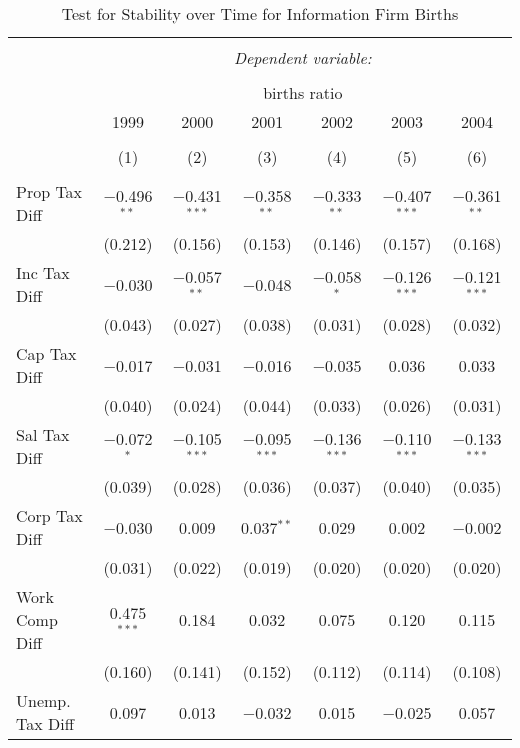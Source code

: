 
\begin{table}[!htbp] \centering 
  \caption{Test for Stability over Time for  Information Firm Births} 
  \label{51year} 
\small 
\begin{tabular}{@{\extracolsep{5pt}}lcccccc} 
\\[-1.8ex]\hline 
\hline \\[-1.8ex] 
 & \multicolumn{6}{c}{\textit{Dependent variable:}} \\ 
\cline{2-7} 
\\[-1.8ex] & \multicolumn{6}{c}{births ratio} \\ 
 & 1999 & 2000 & 2001 & 2002 & 2003 & 2004 \\ 
\\[-1.8ex] & (1) & (2) & (3) & (4) & (5) & (6)\\ 
\hline \\[-1.8ex] 
 Prop Tax Diff & $-$0.496$^{**}$ & $-$0.431$^{***}$ & $-$0.358$^{**}$ & $-$0.333$^{**}$ & $-$0.407$^{***}$ & $-$0.361$^{**}$ \\ 
  & (0.212) & (0.156) & (0.153) & (0.146) & (0.157) & (0.168) \\ 
  Inc Tax Diff & $-$0.030 & $-$0.057$^{**}$ & $-$0.048 & $-$0.058$^{*}$ & $-$0.126$^{***}$ & $-$0.121$^{***}$ \\ 
  & (0.043) & (0.027) & (0.038) & (0.031) & (0.028) & (0.032) \\ 
  Cap Tax Diff & $-$0.017 & $-$0.031 & $-$0.016 & $-$0.035 & 0.036 & 0.033 \\ 
  & (0.040) & (0.024) & (0.044) & (0.033) & (0.026) & (0.031) \\ 
  Sal Tax Diff & $-$0.072$^{*}$ & $-$0.105$^{***}$ & $-$0.095$^{***}$ & $-$0.136$^{***}$ & $-$0.110$^{***}$ & $-$0.133$^{***}$ \\ 
  & (0.039) & (0.028) & (0.036) & (0.037) & (0.040) & (0.035) \\ 
  Corp Tax Diff & $-$0.030 & 0.009 & 0.037$^{**}$ & 0.029 & 0.002 & $-$0.002 \\ 
  & (0.031) & (0.022) & (0.019) & (0.020) & (0.020) & (0.020) \\ 
  Work Comp Diff & 0.475$^{***}$ & 0.184 & 0.032 & 0.075 & 0.120 & 0.115 \\ 
  & (0.160) & (0.141) & (0.152) & (0.112) & (0.114) & (0.108) \\ 
  Unemp. Tax Diff & 0.097 & 0.013 & $-$0.032 & 0.015 & $-$0.025 & 0.057 \\ 

\end{tabular}
\end{table}
